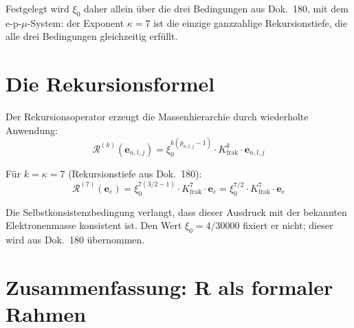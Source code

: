 Festgelegt wird $\xi_0$ daher allein über die drei Bedingungen aus
Dok.~180, mit dem e-p-$\mu$-System: der Exponent $\kappa = 7$ ist die
einzige ganzzahlige Rekursionstiefe, die alle drei Bedingungen
gleichzeitig erfüllt.

\section{Die Rekursionsformel}

Der Rekursionsoperator erzeugt die Massenhierarchie durch wiederholte
Anwendung:
\begin{equation}
  \mathcal{R}^{(k)}(\mathbf{e}_{n,l,j})
  = \xi_0^{k(p_{n,l,j}-1)} \cdot K_{\text{frak}}^k
  \cdot \mathbf{e}_{n,l,j}
  \label{eq:rekursion-k}
\end{equation}

Für $k = \kappa = 7$ (Rekursionstiefe aus Dok.~180):
\begin{equation}
  \mathcal{R}^{(7)}(\mathbf{e}_e) = \xi_0^{7(3/2-1)} \cdot K_{\text{frak}}^7
  \cdot \mathbf{e}_e
  = \xi_0^{7/2} \cdot K_{\text{frak}}^7 \cdot \mathbf{e}_e
\end{equation}

Die Selbstkonsistenzbedingung verlangt, dass dieser Ausdruck mit der
bekannten Elektronenmasse konsistent ist. Den Wert $\xi_0 = 4/30000$
fixiert er nicht; dieser wird aus Dok.~180 übernommen.

\section{Zusammenfassung: R als formaler Rahmen}

\begin{center}
{\footnotesize
{}
}
\end{center}

